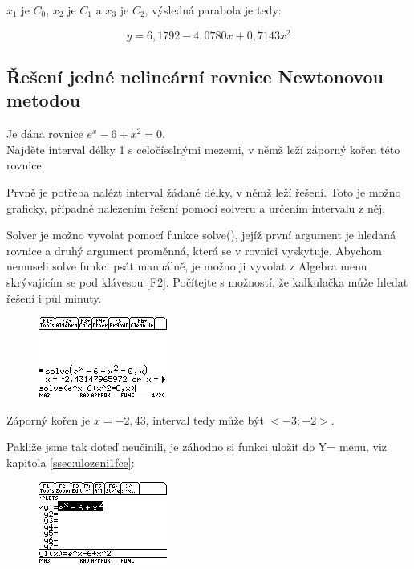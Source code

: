 \documentclass[10pt,a4paper,float]{article}
\begin{document}
$x_1$ je $C_0$, $x_2$ je $C_1$ a $x_3$ je $C_2$, výsledná parabola je tedy:

\[
	y = 6,1792 - 4,0780 x + 0,7143 x^2
\]

\subsection{Řešení jedné nelineární rovnice Newtonovou metodou}
\label{ssec:1newton}
Je dána rovnice $e^x - 6 + x^2 = 0$.\\
Najděte interval délky 1 s celočíselnými mezemi, v němž leží záporný kořen této rovnice.

Prvně je potřeba nalézt interval žádané délky, v němž leží řešení. Toto je možno graficky, případně nalezením řešení pomocí solveru a určením intervalu z něj.

Solver je možno vyvolat pomocí funkce solve(), jejíž první argument je hledaná rovnice a druhý argument proměnná, která se v rovnici vyskytuje. Abychom nemuseli solve funkci psát manuálně, je možno ji vyvolat z Algebra menu skrývajícím se pod klávesou [F2]. Počítejte s možností, že kalkulačka může hledat řešení i půl minuty.

\begin{figure}[H]
	\centering
	\includegraphics[width=.5\textwidth]{img/1NEWTON1.PNG}
\end{figure}

Záporný kořen je $x = -2,43$, interval tedy může být $<-3; -2>$.

\pagebreak

Pakliže jsme tak doteď neučinili, je záhodno si funkci uložit do Y= menu, viz kapitola \ref{ssec:ulozeni1fce}:

\begin{figure}[H]
	\centering
	\includegraphics[width=.5\textwidth]{img/1NEWTON2.PNG}
\end{figure}
\end{document}
